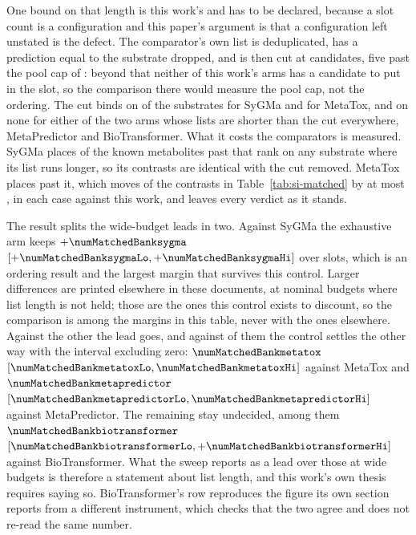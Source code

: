 \documentclass[journal=jcisd8,manuscript=suppinfo,layout=onecolumn]{achemso}
\begin{document}
One bound on that length is this work's and has to be declared, because a slot count is a
configuration and this paper's argument is that a configuration left unstated is the defect. The
comparator's own list is deduplicated, has a prediction equal to the substrate dropped, and is
then cut at \numMatchedCap{} candidates, five past the pool cap of \numHNineCap{}: beyond that
neither of this work's arms has a candidate to put in the slot, so the comparison there would
measure the pool cap, not the ordering. The cut binds on \numMatchedBindssygma{} of the
\numWholeN{} substrates for SyGMa and \numMatchedBindsmetatox{} for MetaTox, and on none for
either of the two arms whose lists are shorter than the cut everywhere, MetaPredictor and
BioTransformer. What it costs the comparators is measured. SyGMa places
\numMatchedPastcutsygmaWord{} of the known metabolites past that rank on any substrate where its
list runs longer, so its contrasts are identical with the cut removed. MetaTox places
\numMatchedPastcutmetatox{} past it, which moves \numMatchedCutmovesWord{} of the contrasts in
Table~\ref{tab:si-matched} by at most \numMatchedCutlargest{}, in each case against this work,
and leaves every verdict as it stands.


The result splits the wide-budget leads in two. Against SyGMa the exhaustive arm keeps
$+\numMatchedBanksygma$ $[+\numMatchedBanksygmaLo, +\numMatchedBanksygmaHi]$ over
\numMatchedBanksygmaSlots{} slots, which is an ordering result and the largest margin that
survives this control. Larger differences are printed elsewhere in these documents, at nominal
budgets where list length is not held; those are the ones this control exists to discount, so the
comparison is among the margins in this table, never with the ones elsewhere. Against the other
\numMatchedOthersWord{} the lead goes, and against \numMatchedOthersagainstWord{} of them the
control settles the other way with the interval excluding zero:
$\numMatchedBankmetatox$ $[\numMatchedBankmetatoxLo, \numMatchedBankmetatoxHi]$ against MetaTox
and $\numMatchedBankmetapredictor$
$[\numMatchedBankmetapredictorLo, \numMatchedBankmetapredictorHi]$ against MetaPredictor. The
remaining \numMatchedOthersundecidedWord{} stay undecided, among them
$\numMatchedBankbiotransformer$ $[\numMatchedBankbiotransformerLo,
+\numMatchedBankbiotransformerHi]$ against BioTransformer. What the sweep reports as a lead over
those \numMatchedOthersWord{} at wide budgets is therefore a statement about list length, and
this work's own thesis requires saying so.
BioTransformer's row reproduces the figure its own section reports from a different instrument,
which checks that the two agree and does not re-read the same number.
\end{document}
